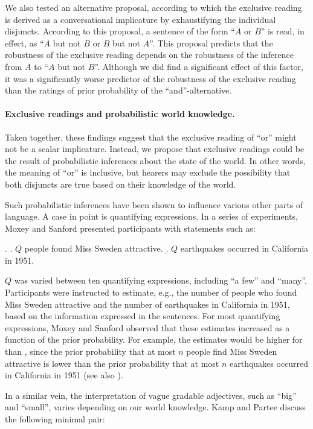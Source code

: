 \documentclass[12pt]{article}
\begin{document}
We also tested an alternative proposal, according to which the exclusive reading is derived as
a conversational implicature by exhaustifying the individual disjuncts. According to this proposal, a
sentence of the form ``$A$ or $B$'' is read, in effect, as ``$A$ but not $B$ or $B$ but not $A$''. This proposal predicts that the robustness of the exclusive reading depends on
the robustness of the inference from $A$ to ``$A$ but not $B$''. Although we did find a
significant effect of this factor, it was a significantly worse predictor of the robustness of
the exclusive reading than the ratings of prior probability of the ``and''-alternative.

\paragraph{Exclusive readings and probabilistic world knowledge.} Taken together, these
findings suggest that the exclusive reading of ``or'' might not be a scalar
implicature. Instead, we propose that exclusive readings could be the result of probabilistic
inferences about the state of the world. In other words, the meaning of ``or'' is inclusive,
but hearers may exclude the possibility that both disjuncts are true based on their knowledge
of the world.

Such probabilistic inferences have been shown to influence various other parts of language. A case in point is quantifying expressions. In a series of experiments, Moxey and Sanford \citeyearpar{moxey1993} presented participants with statements such as:

\ex.	\a. $Q$ people found Miss Sweden attractive.
	\b. $Q$ earthquakes occurred in California in 1951.
	
$Q$ was varied between ten quantifying expressions, including ``a few'' and
``many''. Participants were instructed to estimate, e.g., the number of people who found Miss
Sweden attractive and the number of earthquakes in California in 1951, based on the information
expressed in the sentences. For most quantifying expressions, Moxey and Sanford observed that
these estimates increased as a function of the prior probability. For example, the estimates
would be higher for \Last[a] than \Last[b], since the prior probability that at most $n$ people
find Miss Sweden attractive is lower than the prior probability that at most $n$ earthquakes
occurred in California in 1951 (see also \citealt{pepper1974}). 

In a similar vein, the interpretation of vague gradable adjectives, such as ``big'' and
``small'', varies depending on our world knowledge. Kamp and Partee \citeyearpar{kamp1995}
discuss the following minimal pair:
\end{document}
